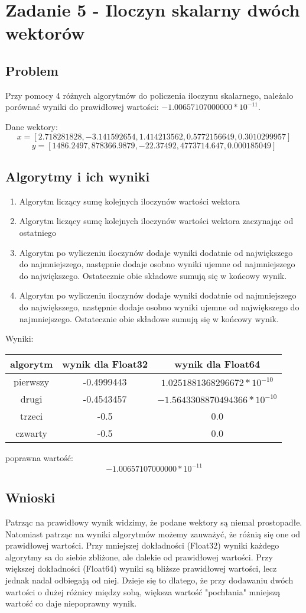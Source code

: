 \documentclass[12pt, a4paper]{article}
\begin{document}
\section{Zadanie 5 - Iloczyn skalarny dwóch wektorów}
\subsection{Problem}
Przy pomocy 4 różnych algorytmów do policzenia iloczynu skalarnego, należało porównać wyniki do prawidłowej wartości: $ -1.00657107000000 * 10^{-11}$.

Dane wektory:
\[x = [2.718281828, -3.141592654, 1.414213562, 0.5772156649, 0.3010299957]\]
\[y = [1486.2497, 878366.9879, -22.37492, 4773714.647, 0.000185049]\]
\subsection{Algorytmy i ich wyniki}
\begin{enumerate}
  \item Algorytm liczący sumę kolejnych iloczynów wartości wektora
  \item Algorytm liczący sumę kolejnych iloczynów wartości wektora zaczynając od ostatniego
  \item Algorytm po wyliczeniu iloczynów dodaje wyniki dodatnie od największego do najmniejszego, następnie dodaje osobno wyniki ujemne od najmniejszego do największego. Ostatecznie obie składowe sumują się w końcowy wynik.
  \item Algorytm po wyliczeniu iloczynów dodaje wyniki dodatnie od najmniejszego do największego, następnie dodaje osobno wyniki ujemne od największego do najmniejszego. Ostatecznie obie składowe sumują się w końcowy wynik.
\end{enumerate}
Wyniki:
\begin{center}
  \begin{tabular}{c|c|c}
    algorytm & wynik dla Float32 & wynik dla Float64\\
    \hline
    pierwszy & -0.4999443 & $1.0251881368296672 * 10^{-10}$\\
    drugi & -0.4543457 & $-1.5643308870494366 * 10^{-10}$\\
    trzeci & -0.5 & 0.0\\
    czwarty & -0.5 & 0.0
  \end{tabular}
\end{center}
poprawna wartość: \[-1.00657107000000 * 10^{-11}\]
\subsection{Wnioski}
Patrząc na prawidłowy wynik widzimy, że podane wektory są niemal prostopadłe. Natomiast patrząc na wyniki algorytmów możemy zauważyć, że różnią się one od prawidłowej wartości. Przy mniejszej dokładności (Float32) wyniki każdego algorytmy sa do siebie zbliżone, ale dalekie od prawidłowej wartości. Przy większej dokładności (Float64) wyniki są bliższe prawidłowej wartości, lecz jednak nadal odbiegają od niej. Dzieje się to dlatego, że przy dodawaniu dwóch wartości o dużej różnicy między sobą, większa wartość "pochłania" mniejszą wartość co daje niepoprawny wynik.
\end{document}
